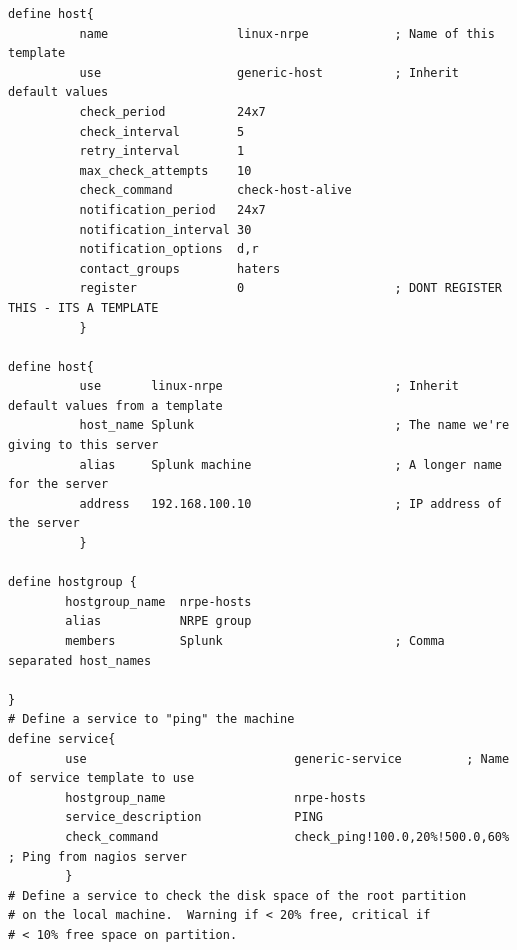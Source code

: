 \documentclass[10pt,a4paper,final]{report}
\begin{document}
\begin{lstlisting}
define host{
          name                  linux-nrpe            ; Name of this template
          use                   generic-host          ; Inherit default values
          check_period          24x7
          check_interval        5
          retry_interval        1
          max_check_attempts    10
          check_command         check-host-alive
          notification_period   24x7
          notification_interval 30
          notification_options  d,r
          contact_groups        haters
          register              0                     ; DONT REGISTER THIS - ITS A TEMPLATE
          }

define host{
          use       linux-nrpe                        ; Inherit default values from a template
          host_name Splunk                            ; The name we're giving to this server
          alias     Splunk machine                    ; A longer name for the server
          address   192.168.100.10                    ; IP address of the server
          }

define hostgroup {
        hostgroup_name  nrpe-hosts
        alias           NRPE group
        members         Splunk                        ; Comma separated host_names

}
# Define a service to "ping" the machine
define service{
        use                             generic-service         ; Name of service template to use
        hostgroup_name                  nrpe-hosts
        service_description             PING
		check_command			        check_ping!100.0,20%!500.0,60% ; Ping from nagios server
        }
# Define a service to check the disk space of the root partition
# on the local machine.  Warning if < 20% free, critical if
# < 10% free space on partition.


\end{lstlisting}
\end{document}
